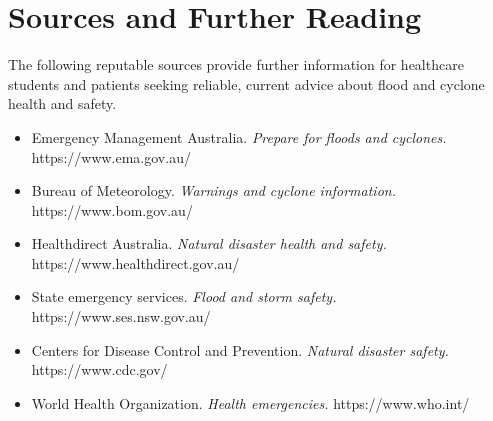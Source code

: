 \section*{Sources and Further Reading}
The following reputable sources provide further information for healthcare students and patients seeking reliable, current advice about flood and cyclone health and safety.
\begin{itemize}
    \item Emergency Management Australia. \textit{Prepare for floods and cyclones.} https://www.ema.gov.au/
    \item Bureau of Meteorology. \textit{Warnings and cyclone information.} https://www.bom.gov.au/
    \item Healthdirect Australia. \textit{Natural disaster health and safety.} https://www.healthdirect.gov.au/
    \item State emergency services. \textit{Flood and storm safety.} https://www.ses.nsw.gov.au/
    \item Centers for Disease Control and Prevention. \textit{Natural disaster safety.} https://www.cdc.gov/
    \item World Health Organization. \textit{Health emergencies.} https://www.who.int/
\end{itemize}
